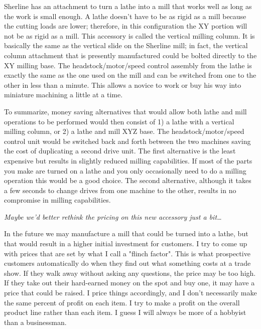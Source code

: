 
Sherline has an attachment to turn a lathe into a mill that works well as long
as the work is small enough. A lathe doesn't have to be as rigid as a mill
because the cutting loads are lower; therefore, in this configuration the XY
portion will not be as rigid as a mill. This accessory is called the vertical
milling column. It is basically the same as the vertical slide on the Sherline
mill; in fact, the vertical column attachment that is presently manufactured
could be bolted directly to the XY milling base. The headstock/motor/speed
control assembly from the lathe is exactly the same as the one used on the mill
and can be switched from one to the other in less than a minute. This allows a
novice to work or buy his way into miniature machining a little at a time.

To summarize, money saving alternatives that would allow both lathe and mill
operations to be performed would then consist of 1) a lathe with a vertical
milling column, or 2) a lathe and mill XYZ base. The headstock/motor/speed
control unit would be switched back and forth between the two machines saving
the cost of duplicating a second drive unit. The first alternative is the least
expensive but results in slightly reduced milling capabilities. If most of the
parts you make are turned on a lathe and you only occasionally need to do a
milling operation this would be a good choice. The second alternative, although
it takes a few seconds to change drives from one machine to the other, results
in no compromise in milling capabilities.

\bigskip
\textit{Maybe we'd better rethink the pricing on this new accessory just a
bit\ldots}
\bigskip


In the future we may manufacture a mill that could be turned into a lathe, but
that would result in a higher initial investment for customers. I try to come up
with prices that are set by what I call a "flinch factor". This is what
prospective customers automatically do when they find out what something costs
at a trade show. If they walk away without asking any questions, the price may
be too high. If they take out their hard-earned money on the spot and buy one,
it may have a price that could be raised. I price things accordingly, and I
don't necessarily make the same percent of profit on each item. I try to make a
profit on the overall product line rather than each item. I guess I will always
be more of a hobbyist than a businessman.

